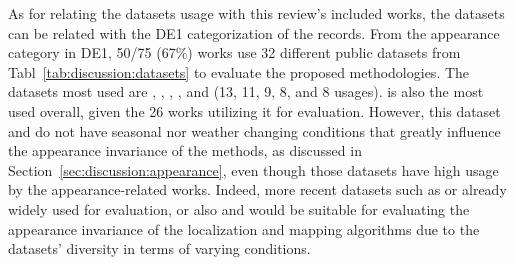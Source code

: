 As for relating the datasets usage with this review's included works, the datasets can be related with the DE1 categorization of the records. From the appearance category in DE1, 50/75 (67\%) works use 32 different public datasets from Tabl~\ref{tab:discussion:datasets} to evaluate the proposed methodologies. The datasets most used are , , , , and  (13, 11, 9, 8, and 8 usages).  is also the most used overall, given the 26 works utilizing it for evaluation. However, this dataset and  do not have seasonal nor weather changing conditions that greatly influence the appearance invariance of the methods, as discussed in Section~\ref{sec:discussion:appearance}, even though those datasets have high usage by the appearance-related works. Indeed, more recent datasets such as  or  already widely used for evaluation, or also  and  would be suitable for evaluating the appearance invariance of the localization and mapping algorithms due to the datasets' diversity in terms of varying conditions.

